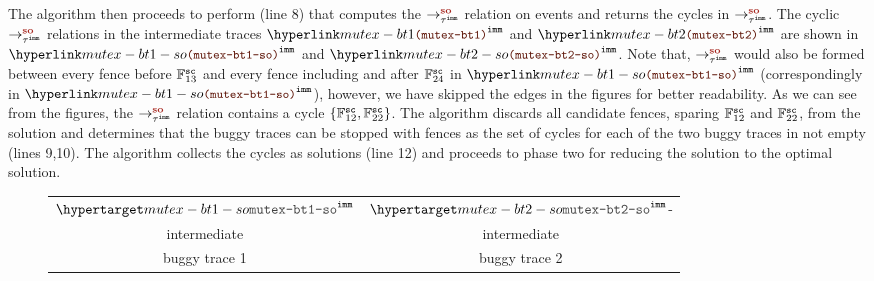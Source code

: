 The algorithm then proceeds to perform \stfence (line 8) that 
computes the $\so{\imm{\tau}}{}{}$ relation on \sc 
events and returns the cycles in $\so{\imm{\tau}}{}{}$.
The cyclic $\so{\imm{\tau}}{}{}$ relations in the intermediate
traces $\imm{\hlref{mutex-bt1}}$ and $\imm{\hlref{mutex-bt2}}$ 
are shown in $\imm{\hlref{mutex-bt1-so}}$ and 
$\imm{\hlref{mutex-bt2-so}}$. 
%
Note that, $\so{\imm{\tau}}{}{}$ 
would also be formed between every fence before 
$\mathbb{F}^\sc_{13}$ and every fence including and after 
$\mathbb{F}^\sc_{24}$ in $\imm{\hlref{mutex-bt1-so}}$ 
(correspondingly in $\imm{\hlref{mutex-bt1-so}}$), however, we 
have skipped the edges in the figures for better readability.
%
As we can see from the figures, the $\so{\imm{\tau}}{}{}$ 
relation contains a cycle $\{\mathbb{F}^\sc_{12}, 
\mathbb{F}^\sc_{22}\}$. The algorithm discards all candidate 
fences, sparing $\mathbb{F}^\sc_{12}$ and $\mathbb{F}^\sc_{22}$, 
from the solution and determines that the buggy traces 
can be stopped with fences as the set of cycles for each of the 
two buggy traces in not empty (lines 9,10).
%
The algorithm collects the cycles as solutions (line 12) and 
proceeds to phase two for reducing the solution to the optimal 
solution.

\begin{figure}[!h]
	\begin{tabular}{|c|c|}
		\hline
		\resizebox{0.24\textwidth}{!}{} &
		\resizebox{0.24\textwidth}{!}{} \\
		\hline
		
		\multicolumn{1}{c}{$\imm{\hl{mutex-bt1-so}}$}  &
		\multicolumn{1}{c}{$\imm{\hl{mutex-bt2-so}}$-} \\
		
		\multicolumn{1}{c}{intermediate} &
		\multicolumn{1}{c}{intermediate} \\
		
		\multicolumn{1}{c}{buggy trace 1} &
		\multicolumn{1}{c}{buggy trace 2} \\
	\end{tabular}
\end{figure}

